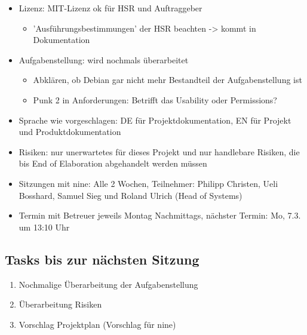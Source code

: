 \documentclass[class=scrbook,crop=false]{standalone}
\begin{document}
	\begin{itemize}
		\item Lizenz: MIT-Lizenz ok für HSR und Auftraggeber
		\begin{itemize}
		    \item 'Ausführungsbestimmungen' der HSR beachten -> kommt in Dokumentation
	    \end{itemize}
		\item Aufgabenstellung: wird nochmals überarbeitet
		\begin{itemize}
		    \item Abklären, ob Debian gar nicht mehr Bestandteil der Aufgabenstellung ist
		    \item Punk 2 in Anforderungen: Betrifft das Usability oder Permissions?
	    \end{itemize}
		\item Sprache wie vorgeschlagen: DE für Projektdokumentation, EN für Projekt und Produktdokumentation
		\item Risiken: nur unerwartetes für dieses Projekt und nur handlebare Risiken, die bis End of Elaboration abgehandelt werden müssen
		\item Sitzungen mit \gls{nine}: Alle 2 Wochen, Teilnehmer: Philipp Christen, Ueli Bosshard, Samuel Sieg und Roland Ulrich (Head of Systems)
		\item Termin mit Betreuer jeweils Montag Nachmittags, nächster Termin: Mo, 7.3. um 13:10 Uhr
	\end{itemize}
	
    \subsection*{Tasks bis zur nächsten Sitzung}
    
    \begin{enumerate}
        \item Nochmalige Überarbeitung der Aufgabenstellung
        \item Überarbeitung Risiken
        \item Vorschlag Projektplan (Vorschlag für \gls{nine})
    \end{enumerate}
\end{document}
